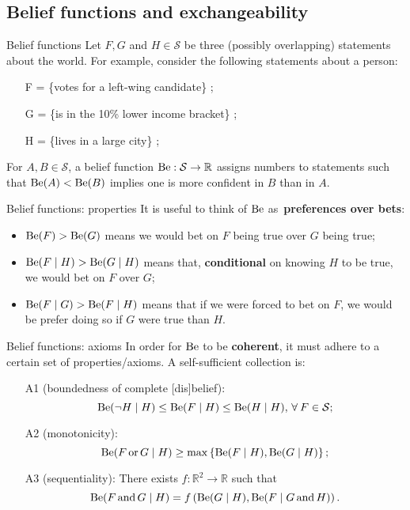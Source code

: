 \subsection{Belief functions and exchangeability}
\begin{frame}{Belief functions}
Let $F, G$ and $H \in \mathcal{S}$ be three (possibly overlapping) statements about the world.
For example, consider the following statements about a person:
\begin{itemize}
 \item [F] = \{votes for a left-wing candidate\} ;
 \item [G] = \{is in the 10\% lower income bracket\} ;
 \item [H] = \{lives in a large city\} ;
\end{itemize}

 \begin{defn}
 \label{def:belief_function} 
 For $A, B \in \mathcal{S}$, a belief function $\operatorname{Be} : \mathcal{S} \to \mathbb{R}$ assigns numbers to statements such that $\operatorname{Be}(A) < \operatorname{Be}(B)$ implies one is more confident in $B$ than in $A$.
 \end{defn}
\end{frame}
\begin{frame}{Belief functions: properties}
It is useful to think of $\operatorname{Be}$ as~\textbf{preferences over bets}:
 \begin{itemize}
  \item $\operatorname{Be}(F) > \operatorname{Be}(G)$ means we would bet on $F$ being true over $G$ being true;
  \item $\operatorname{Be}(F\mid H) > \operatorname{Be}(G \mid H)$ means that, \textbf{conditional} on knowing $H$ to be true, we would bet on $F$ over $G$;
  \item $\operatorname{Be}(F\mid G) > \operatorname{Be}(F \mid H)$ means that if we were forced to bet on $F$, we would be prefer doing so if $G$ were true than $H$.
 \end{itemize}
\end{frame}
\begin{frame}{Belief functions: axioms}
 In order for $\operatorname{Be}$ to be \textbf{coherent}, it must adhere to a certain set of properties/axioms.
 A self-sufficient collection is:
 \begin{itemize}
  \item [A1]  (boundedness of complete [dis]belief): $$\operatorname{Be}(\lnot H \mid H) \leq \operatorname{Be}(F \mid H) \leq \operatorname{Be}(H \mid H),\, \forall\: F \in \mathcal{S};$$
  \item [A2]  (monotonicity):
  $$\operatorname{Be}(F \, \text{or} \, G \mid H) \geq \max \left\{ \operatorname{Be}(F \mid H), \operatorname{Be}(G \mid H) \right\};$$
  \item [A3] (sequentiality): There exists $f: \mathbb{R}^2 \to \mathbb{R}$ such that
  $$ \operatorname{Be}(F\, \text{and} \, G \mid H) = f\left(\operatorname{Be}(G\mid H), \operatorname{Be}(F \mid G\, \text{and} \, H) \right).$$
 \end{itemize}
\end{frame}
